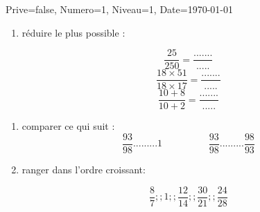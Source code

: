 \documentclass[a4paper,12pt]{article}
\begin{document}
\begin{Maquette}[DM]{Prive=false, Numero=1, Niveau=1, Date=\today}
\begin{exercice}
	
	
\end{exercice}

\begin{exercice}
\begin{enumerate}
		\item réduire le plus possible :
		
		\[\dfrac{25}{250}=\dfrac{.......}{.....}\]
\[\dfrac{18\times 51}{18 \times 17}=\dfrac{.......}{.....}\]
\[\dfrac{10+8}{10+2}=\dfrac{.......}{.....}\]
		
	\end{enumerate}
\end{exercice}

\begin{exercice}
\begin{enumerate}
		\item comparer ce qui suit  :	
$$\dfrac{93}{98}......... 1 \hspace{1cm}   \hspace{1cm}
\dfrac{93}{98}.........\dfrac{98}{93}$$

\item ranger dans l'ordre croissant:

$$\dfrac{8}{7} ;; 1 ;; \dfrac{12}{14} ;; \dfrac{30}{21}  ;; \dfrac{24}{28}$$	

\end{enumerate}
\end{exercice}

\end{Maquette}
\end{document}
